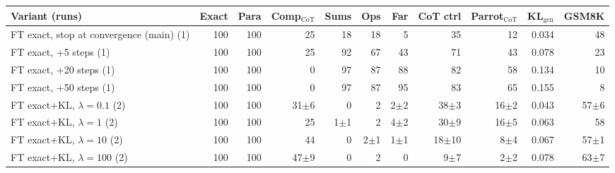 \begin{tabular}{lrrrrrrrrrr}
\toprule
Variant (runs) & Exact & Para & Comp$_\text{CoT}$ & Sums & Ops & Far & CoT ctrl & Parrot$_\text{CoT}$ & KL$_\text{gen}$ & GSM8K\\
\midrule
FT exact, stop at convergence (main) (1) & 100 & 100 & 25 & 18 & 18 & 5 & 35 & 12 & 0.034 & 48 \\
FT exact, +5 steps (1) & 100 & 100 & 25 & 92 & 67 & 43 & 71 & 43 & 0.078 & 23 \\
FT exact, +20 steps (1) & 100 & 100 & 0 & 97 & 87 & 88 & 82 & 58 & 0.134 & 10 \\
FT exact, +50 steps (1) & 100 & 100 & 0 & 97 & 87 & 95 & 83 & 65 & 0.155 & 8 \\
FT exact+KL, $\lambda=0.1$ (2) & 100 & 100 & 31\tiny{$\pm$6} & 0 & 2 & 2\tiny{$\pm$2} & 38\tiny{$\pm$3} & 16\tiny{$\pm$2} & 0.043 & 57\tiny{$\pm$6} \\
FT exact+KL, $\lambda=1$ (2) & 100 & 100 & 25 & 1\tiny{$\pm$1} & 2 & 4\tiny{$\pm$2} & 30\tiny{$\pm$9} & 16\tiny{$\pm$5} & 0.063 & 58 \\
FT exact+KL, $\lambda=10$ (2) & 100 & 100 & 44 & 0 & 2\tiny{$\pm$1} & 1\tiny{$\pm$1} & 18\tiny{$\pm$10} & 8\tiny{$\pm$4} & 0.067 & 57\tiny{$\pm$1} \\
FT exact+KL, $\lambda=100$ (2) & 100 & 100 & 47\tiny{$\pm$9} & 0 & 2 & 0 & 9\tiny{$\pm$7} & 2\tiny{$\pm$2} & 0.078 & 63\tiny{$\pm$7} \\
\bottomrule
\end{tabular}
